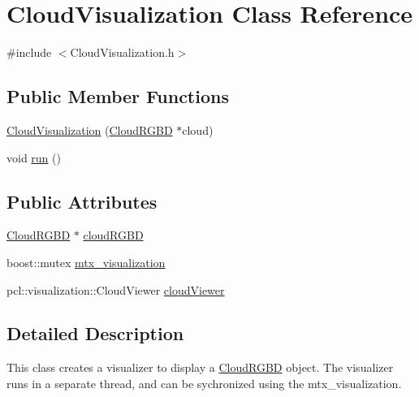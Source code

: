\hypertarget{classCloudVisualization}{\section{\-Cloud\-Visualization \-Class \-Reference}
\label{classCloudVisualization}
}


{\ttfamily \#include $<$\-Cloud\-Visualization.\-h$>$}

\subsection*{\-Public \-Member \-Functions}
\begin{DoxyCompactItemize}
\item 
\hyperlink{classCloudVisualization_aecb0d8a62730eff91f93dff4fc8ff705}{\-Cloud\-Visualization} (\hyperlink{classCloudRGBD}{\-Cloud\-R\-G\-B\-D} $\ast$cloud)
\item 
void \hyperlink{classCloudVisualization_a8ef8a1cd84e7ed677147fe1f85c295bd}{run} ()
\end{DoxyCompactItemize}
\subsection*{\-Public \-Attributes}
\begin{DoxyCompactItemize}
\item 
\hyperlink{classCloudRGBD}{\-Cloud\-R\-G\-B\-D} $\ast$ \hyperlink{classCloudVisualization_afda3094aaee3c06cbe5fb004b9a14f68}{cloud\-R\-G\-B\-D}
\item 
boost\-::mutex \hyperlink{classCloudVisualization_a60ec9169f4b99d64b6a9248f2e4f469c}{mtx\-\_\-visualization}
\item 
pcl\-::visualization\-::\-Cloud\-Viewer \hyperlink{classCloudVisualization_af2d2977ac87ebe1bf9ae8dbf34851e15}{cloud\-Viewer}
\end{DoxyCompactItemize}


\subsection{\-Detailed \-Description}
\-This class creates a visualizer to display a \hyperlink{classCloudRGBD}{\-Cloud\-R\-G\-B\-D} object. \-The visualizer runs in a separate thread, and can be sychronized using the mtx\-\_\-visualization. 

